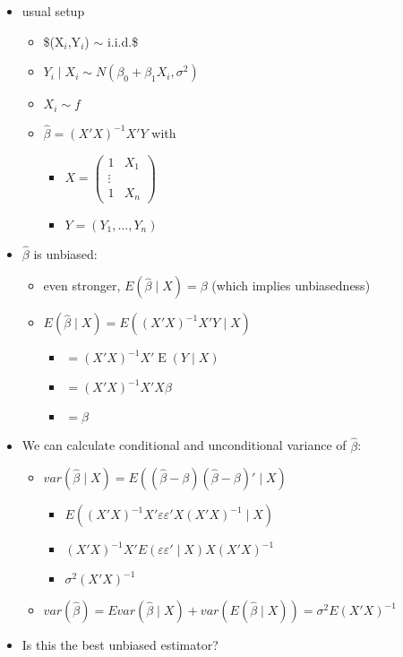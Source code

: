 \documentclass[11pt]{article}
\DeclareMathOperator{\E}{E}
\begin{document}
\begin{itemize}
\begin{itemize}
\item usual setup
\begin{itemize}
\item \$(X$_i$,Y$_i$) $\sim$ i.i.d.\$
\item $Y_i \mid X_i \sim N(\beta_0 + \beta_1 X_i, \sigma^2)$
\item $X_i \sim f$
\item $\hat\beta = (X'X)^{-1} X'Y$ with
\begin{itemize}
\item $X = \begin{pmatrix} 1 & X_1 \\ \vdots \\ 1 & X_n \end{pmatrix}$
\item $Y = (Y_1, \dots, Y_n)$
\end{itemize}
\end{itemize}
\item $\hat\beta$ is unbiased:
\begin{itemize}
\item even stronger, $E(\hat\beta \mid X) = \beta$ (which implies unbiasedness)
\item $E(\hat\beta \mid X) = E((X'X)^{-1} X'Y \mid X)$
\begin{itemize}
\item $=(X'X)^{-1}X' \E(Y \mid X)$
\item $=(X'X)^{-1}X'X\beta$
\item $=\beta$
\end{itemize}
\end{itemize}
\item We can calculate conditional and unconditional variance of $\hat\beta$:
\begin{itemize}
\item $var(\hat\beta \mid X) = E((\hat\beta - \beta)(\hat\beta - \beta)' \mid X)$
\begin{itemize}
\item $E((X'X)^{-1}X'\varepsilon\varepsilon'X(X'X)^{-1} \mid X)$
\item $(X'X)^{-1}X' E(\varepsilon\varepsilon' \mid X) X(X'X)^{-1}$
\item $\sigma^2 (X'X)^{-1}$
\end{itemize}
\item $var(\hat\beta) = E var(\hat\beta \mid X) + var(E(\hat\beta \mid X)) = \sigma^2 E(X'X)^{-1}$
\end{itemize}
\item Is this the best unbiased estimator?

\end{itemize}
\end{itemize}
\end{document}
